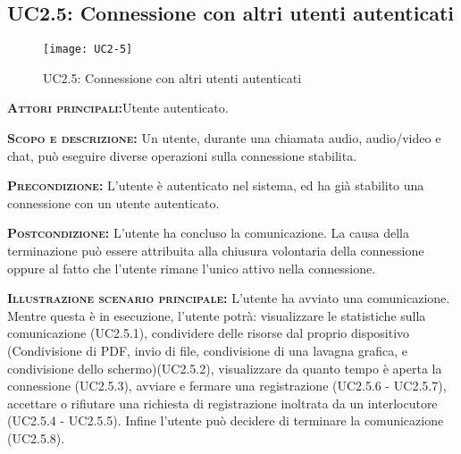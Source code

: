 \subsection{UC2.5: Connessione con altri utenti autenticati}
\begin{figure}[H]
\begin{center}
\texttt{[image: UC2-5]}
\caption{UC2.5: Connessione con altri utenti autenticati}\label{fig:connessione}
\end{center}
\end{figure}
\begin{description}
\item{\scshape\bfseries Attori principali:}Utente autenticato.
\item{\scshape\bfseries Scopo e descrizione:} Un utente, durante una chiamata audio, audio/video e chat, può eseguire diverse operazioni sulla connessione stabilita.
\item{\scshape\bfseries Precondizione:} L'utente è autenticato nel sistema, ed ha già stabilito una connessione con un utente autenticato.
\item{\scshape\bfseries Postcondizione:} L'utente ha concluso la comunicazione. La causa della terminazione può essere attribuita alla chiusura volontaria della connessione oppure al fatto che l'utente rimane l'unico attivo nella connessione.
\item{\scshape\bfseries Illustrazione scenario principale:} L'utente ha avviato una comunicazione. Mentre questa è in esecuzione, l'utente potrà: visualizzare le statistiche sulla comunicazione (UC2.5.1), condividere delle risorse dal proprio dispositivo (Condivisione di PDF, invio di file, condivisione di una lavagna grafica, e condivisione dello schermo)(UC2.5.2), visualizzare da quanto tempo è aperta la connessione (UC2.5.3), avviare e fermare una registrazione (UC2.5.6 - UC2.5.7), accettare o rifiutare una richiesta di registrazione inoltrata da un interlocutore (UC2.5.4 - UC2.5.5). Infine l'utente può decidere di terminare la comunicazione (UC2.5.8).
\end{description}

